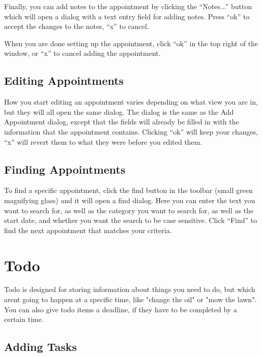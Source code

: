 \documentclass[12pt,letterpaper,oneside, openany]{book} \usepackage[latin1] {inputenc}
\begin{document}
Finally, you can add notes to the appointment by clicking the ``Notes...'' button which will open a dialog with a text entry field for adding notes. Press ``ok'' to accept the changes to the notes, ``x'' to cancel. 

When you are done setting up the appointment, click ``ok'' in the top right of the window, or ``x'' to cancel adding the appointment. 

\section{Editing Appointments}

How you start editing an appointment varies depending on what view you are in, but they will all open the same dialog. The dialog is the same as the Add Appointment dialog, except that the fields will already be filled in with the information that the appointment contains. Clicking ``ok'' will keep your changes, ``x'' will revert them to what they were before you edited them. 

\section{Finding Appointments}

To find a specific appointment, click the find button in the toolbar (small green magnifying glass) and it will open a find dialog. Here you can enter the text you want to search for, as well as the category you want to search for, as well as the start date, and whether you want the search to be case sensitive. Click ``Find'' to find the next appointment that matches your criteria.

\chapter{Todo}
Todo is designed for storing information about things you need to do, but which arent going to happen at a specific time, like "change the oil" or "mow the lawn". You can also give todo items a deadline, if they have to be completed by a certain time. 

\section{Adding Tasks}
\end{document}

